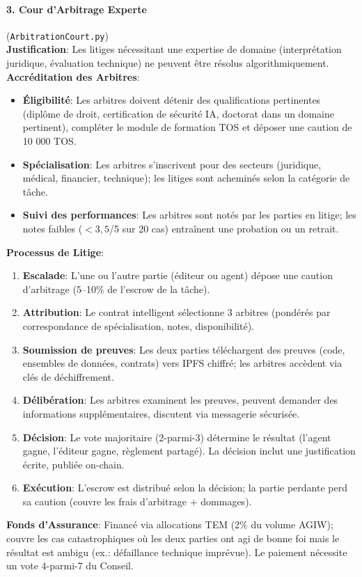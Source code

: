 \documentclass[11pt]{article}
\begin{document}
\paragraph{3. Cour d'Arbitrage Experte} (\texttt{ArbitrationCourt.py})\\
\textbf{Justification}: Les litiges nécessitant une expertise de domaine (interprétation juridique, évaluation technique) ne peuvent être résolus algorithmiquement.\\
\textbf{Accréditation des Arbitres}:
\begin{itemize}[noitemsep]
  \item \textbf{Éligibilité}: Les arbitres doivent détenir des qualifications pertinentes (diplôme de droit, certification de sécurité IA, doctorat dans un domaine pertinent), compléter le module de formation TOS et déposer une caution de 10 000 TOS.
  \item \textbf{Spécialisation}: Les arbitres s'inscrivent pour des secteurs (juridique, médical, financier, technique); les litiges sont acheminés selon la catégorie de tâche.
  \item \textbf{Suivi des performances}: Les arbitres sont notés par les parties en litige; les notes faibles ($<3,5$/5 sur 20 cas) entraînent une probation ou un retrait.
\end{itemize}
\textbf{Processus de Litige}:
\begin{enumerate}[noitemsep]
  \item \textbf{Escalade}: L'une ou l'autre partie (éditeur ou agent) dépose une caution d'arbitrage (5--10\% de l'escrow de la tâche).
  \item \textbf{Attribution}: Le contrat intelligent sélectionne 3 arbitres (pondérés par correspondance de spécialisation, notes, disponibilité).
  \item \textbf{Soumission de preuves}: Les deux parties téléchargent des preuves (code, ensembles de données, contrats) vers IPFS chiffré; les arbitres accèdent via clés de déchiffrement.
  \item \textbf{Délibération}: Les arbitres examinent les preuves, peuvent demander des informations supplémentaires, discutent via messagerie sécurisée.
  \item \textbf{Décision}: Le vote majoritaire (2-parmi-3) détermine le résultat (l'agent gagne, l'éditeur gagne, règlement partagé). La décision inclut une justification écrite, publiée on-chain.
  \item \textbf{Exécution}: L'escrow est distribué selon la décision; la partie perdante perd sa caution (couvre les frais d'arbitrage + dommages).
\end{enumerate}
\textbf{Fonds d'Assurance}: Financé via allocations TEM (2\% du volume AGIW); couvre les cas catastrophiques où les deux parties ont agi de bonne foi mais le résultat est ambigu (ex.: défaillance technique imprévue). Le paiement nécessite un vote 4-parmi-7 du Conseil.
\end{document}
